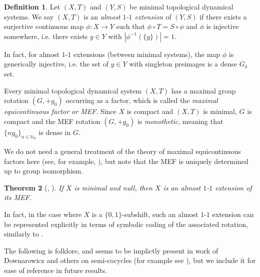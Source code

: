 \documentclass[11pt,reqno]{amsart}
\newtheorem{theorem}{Theorem}[section]
\theoremstyle{definition}
\newtheorem{definition}[theorem]{Definition}
\theoremstyle{plain}
\newcommand{\N}{\mathbb{N}}
\newcommand{\AuthornoteA}[2]{{\sf\small\color{magenta}{[#1: #2]}}}
\newcommand{\AuthornoteR}[2]{{\sf\small\color{blue}{[#1: #2]}}}
\newcommand{\Anote}{\AuthornoteA{A}}
\newcommand{\rp}{\AuthornoteR{R}}
\begin{document}

\begin{definition}
Let $(X, T)$ and $(Y, S)$ be minimal topological dynamical systems. We say $(X, T)$ is an \emph{almost $1$-$1$ extension} of $(Y, S)$ if there exists a surjective continuous map $\phi: X \rightarrow Y$ such that $\phi \circ T = S \circ \phi$ and $\phi$ is injective somewhere, i.e. there exists $y \in Y$ with $|\phi^{-1}(\{y\})| = 1$.
\end{definition}

In fact, for almost $1$-$1$ extensions (between minimal systems), the map $\phi$ is generically injective, i.e. the set of $y \in Y$ with singleton preimages is a dense $G_\delta$ set.

Every minimal topological dynamical system $(X,T)$ has a maximal group rotation $(G, +g_0)$ occurring as a factor, which is called the \emph{maximal equicontinuous factor or MEF}. Since $X$ is compact and $(X,T)$ is minimal, $G$ is compact and the MEF rotation $(G, +g_0)$ is \emph{monothetic}, meaning that $\{ng_0\}_{n \in \N_0}$ is dense in $G$.



We do not need a general treatment of the theory of maximal equicontinuous factors here (see, for example, \cite{Auslander88, MEFref}), but note that the MEF is uniquely determined up to group isomorphism.

\begin{theorem}[{\cite[Theorem 4.3]{Huang_Li_Shao_Ye-null_systems}}, {\cite[Corollary 7.16]{Kerr_Li-independence_Cstar}}]
\label{kerrli}
If $X$ is minimal and null, then $X$ is an almost $1$-$1$ extension of its MEF.%
\end{theorem}

In fact, in the case where $X$ is a $\{0,1\}$-subshift, such an almost $1$-$1$ extension can be represented explicitly in terms of symbolic coding of the associated rotation, similarly to .

The following is folklore, and seems to be implictly present in work of Downarowicz and others on semi-cocycles (for example see \cite{cocycles}), but we include it for ease of reference in future results.
\end{document}
